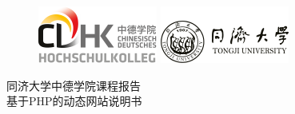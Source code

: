 \smallskip
\begin{center}

\begin{figure}[H]
	\centering
	\begin{minipage}[t]{0.4\linewidth}
		\centering
		\includegraphics[width=\linewidth]{figure/header_logo_cdhk}
	\end{minipage}
    \quad
	\begin{minipage}[t]{0.4\linewidth}
		\centering
		\includegraphics[width=\linewidth]{figure/header_logo_tongji}
	\end{minipage}
\end{figure}
\vspace*{2.0cm}
{  同济大学中德学院课程报告} \\
\vspace*{2.1cm}
 {  基于PHP的动态网站说明书 }\\
\vspace*{6.0cm}


\end{center}
